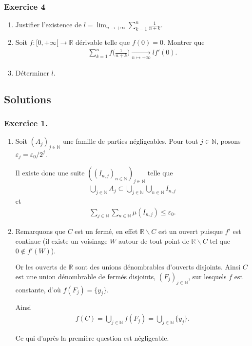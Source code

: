 \documentclass{article}
\begin{document}
\subsubsection*{Exercice 4}
\begin{enumerate}
\item Justifier l'existence de $\displaystyle l=\lim_{n\to+\infty} \sum_{k=1}^{n} \frac{1}{n+k}$.
\item Soit $f : [0,+\infty[ \to \mathbb{R}$ dérivable telle que $f(0)=0$. Montrer que 
\begin{align*}
\sum_{k=1}^{n}{f\bigg(\frac{1}{n+k}\bigg)} \xrightarrow[n\mapsto+\infty]{} lf'(0).
\end{align*}
\item Déterminer $l$.
\end{enumerate}
\subsection*{Solutions} 
\subsubsection*{Exercice 1.}
\begin{enumerate}
\item Soit $(A_j)_{j\in\mathbb{N}}$ une famille de parties négligeables. Pour tout $j\in\mathbb{N}$, posons $\varepsilon_j = \varepsilon_0/2^j$.

Il existe donc une suite $((I_{n,j})_{n\in\mathbb{N}})_{j\in\mathbb{N}}$ telle que \begin{align*}
\bigcup_{j\in\mathbb{N}}{A_j}\subset \bigcup_{j\in\mathbb{N}}\bigcup_{n\in\mathbb{N}}I_{n,j}
\end{align*}
et 
\begin{align*}
\sum_{j\in\mathbb{N}}{\sum_{n\in\mathbb{N}}}{\mu(I_{n,j})}\leq \varepsilon_0.
\end{align*}
\item Remarquons que $C$ est un fermé, en effet $\mathbb{R}\backslash C$ est un ouvert puisque $f'$ est continue (il existe un voisinage $W$ autour de tout point de $\mathbb{R}\backslash C$ tel que $0 \notin f'(W)$).

Or les ouverts de $\mathbb{R}$ sont des unions dénombrables d'ouverts disjoints. Ainsi $C$ est une union dénombrable de fermés disjoints, $(F_j)_{j\in\mathbb{N}}$, sur lesquels $f$ est constante, d'où $f(F_j)=\{y_j\}$.

Ainsi 
\begin{align*}
f(C) = \bigcup_{j\in\mathbb{N}}{f(F_j)}=\bigcup_{j\in\mathbb{N}}\{y_j\}.
\end{align*}

Ce qui d'après la première question est négligeable.
\end{enumerate}
\newpage{}
\end{document}
